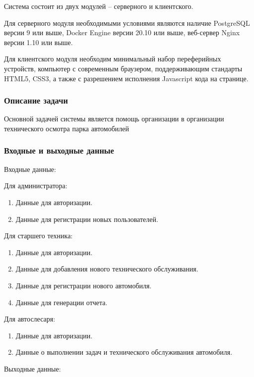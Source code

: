 \documentclass[../nirs.tex]{subfiles}
\begin{document}
    Система состоит из двух модулей -- серверного и клиентского.

    Для серверного модуля необходимыми условиями являются наличие PostgreSQL
    версии 9 или выше, Docker Engine версии 20.10 или выше, веб-сервер Nginx
    версии 1.10 или выше.

    Для клиентского модуля необходим минимальный набор переферийных устройств,
    компьютер с современным браузером,
    поддерживающим стандарты HTML5, CSS3, а также с разрешением исполнения
    Javascript кода на странице.

    \subsubsection*{Описание задачи}

    Основной задачей системы является помощь организации в организации
    технического осмотра парка автомобилей

    \subsubsection*{Входные и выходные данные}
    Входные данные:

    Для администратора:
    \begin{enumerate}
        \item Данные для авторизации.
        \item Данные для регистрации новых пользователей.
    \end{enumerate}

    Для старшего техника:
    \begin{enumerate}
        \item Данные для авторизации.
        \item Данные для добавления нового технического обслуживания.
        \item Данные для регистрации нового автомобиля.
        \item Данные для генерации отчета.
    \end{enumerate}

    Для автослесаря:
    \begin{enumerate}
        \item Данные для авторизации.
        \item Данные о выполнении задач и технического обслуживания автомобиля.
    \end{enumerate}

    Выходные данные:
\end{document}

